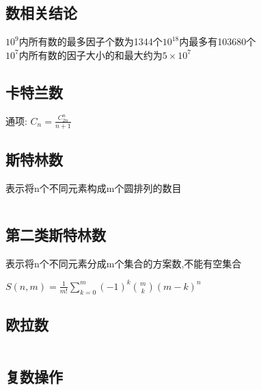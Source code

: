 \documentclass[twocolumn,a4]{article}
\begin{document}
\subsection{数相关结论}
$10^{9}$内所有数的最多因子个数为1344个$10^{18}$内最多有103680个\\
$10^{7}$内所有数的因子大小的和最大约为$5\times 10^{7}$\\
\subsection{卡特兰数}
\begin{Large}
    通项: $C_n=\frac{C_{2n}^{n}}{n+1}$
\end{Large}

\subsection{斯特林数}
表示将n个不同元素构成m个圆排列的数目
\begin{lstlisting}

\end{lstlisting}

\subsection{第二类斯特林数}
表示将n个不同元素分成m个集合的方案数,不能有空集合\\
\begin{large}
    $S(n,m)=\frac{1}{m!}\sum_{k=0}^{m}(-1)^{k}\binom{m}{k}(m-k)^{n} $
\end{large}

\subsection{欧拉数}
\begin{lstlisting}

\end{lstlisting}

\subsection{复数操作}
\begin{lstlisting}

\end{lstlisting}
\end{document}
